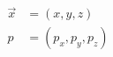 \documentclass[preview]{standalone}
\begin{document}
\begin{align*}
\begin{aligned} \vec{x} &=(x,y,z) \\ \hat{p} &= (p_x, p_y, p_z) \end{aligned}
\end{align*}
\end{document}

